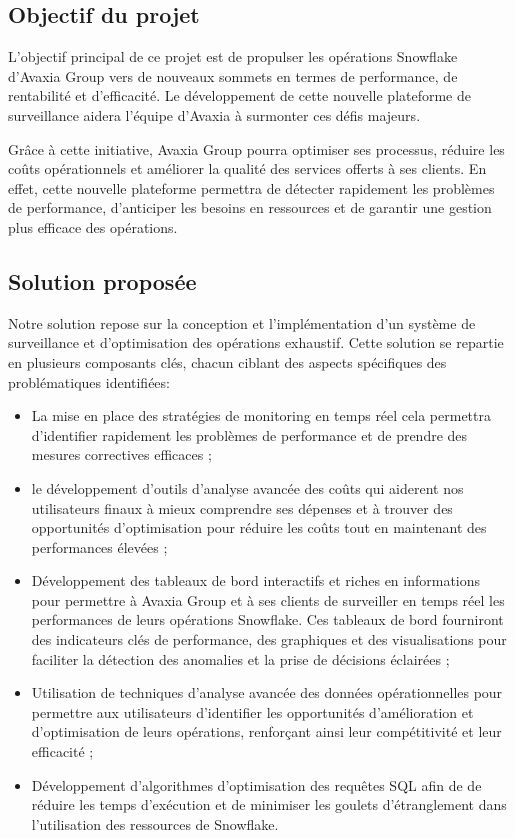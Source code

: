 \subsection{Objectif du projet}
\par  L'objectif principal de ce projet est de propulser les opérations Snowflake d'Avaxia Group vers de nouveaux sommets en termes de performance, de rentabilité et d'efficacité. 
Le développement de cette nouvelle plateforme de surveillance aidera l'équipe d'Avaxia à surmonter ces défis majeurs.
\par Grâce à cette initiative, Avaxia Group pourra optimiser ses processus, réduire les coûts opérationnels et améliorer la qualité des services offerts à ses clients. 
En effet, cette nouvelle plateforme permettra de détecter rapidement les problèmes de performance, d'anticiper les besoins en ressources et de garantir une gestion plus efficace des opérations.
\subsection{Solution proposée}
\par Notre solution repose sur la conception et l'implémentation d'un système de surveillance et d'optimisation des opérations exhaustif. 
Cette solution se repartie en plusieurs composants clés, chacun ciblant des aspects spécifiques des problématiques identifiées:

\begin{itemize}
    \item La mise en place des stratégies de monitoring en temps réel cela permettra d'identifier rapidement les problèmes de performance et de prendre des mesures correctives efficaces ;
    \item le développement d'outils d'analyse avancée des coûts qui aiderent nos utilisateurs finaux à mieux comprendre ses dépenses et à trouver des opportunités d'optimisation pour 
    réduire les coûts tout en maintenant des performances élevées ;
    \item Développement des tableaux de bord interactifs et riches en informations pour permettre à Avaxia Group et à ses clients de surveiller en temps réel les performances de leurs opérations Snowflake. 
    Ces tableaux de bord fourniront des indicateurs clés de performance, des graphiques et des visualisations pour faciliter la détection des anomalies et la prise de décisions éclairées ;
    \item Utilisation de techniques d'analyse avancée des données opérationnelles pour permettre aux utilisateurs  d'identifier les opportunités d'amélioration et d'optimisation de leurs opérations, 
    renforçant ainsi leur compétitivité et leur efficacité ;
    \item Développement d'algorithmes d'optimisation des requêtes SQL afin de de réduire les temps d'exécution et de minimiser les goulets d'étranglement dans l'utilisation des ressources de Snowflake.
\end{itemize}


